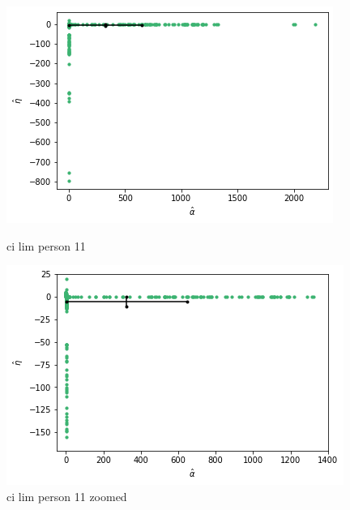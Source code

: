 \begin{figure}
    \centering
    \begin{minipage}{0.48\textwidth}
        \centering
        \includegraphics[scale=0.37]{pictures/ci_lim_a_e_person11.png}
        \caption{ci lim person 11}
        \label{fig:ci_lim_a_e_person_11}
    \end{minipage}\hfill
    \begin{minipage}{0.48\textwidth}
        \centering
        \includegraphics[scale=0.37]{pictures/ci_lim_a_e_person11_zoomed.png}
        \caption{ci lim person 11 zoomed}
        \label{fig:ci_lim_a_e_person_11_zoomed}
    \end{minipage}
\end{figure}

